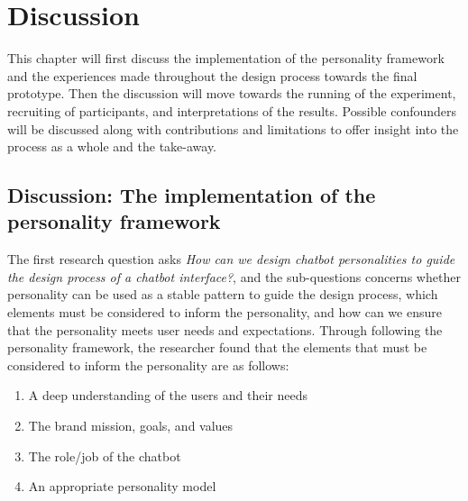 \chapter{Discussion}
\label{chap:discussion}

This chapter will first discuss the implementation of the personality framework and the experiences made throughout the design process towards the final prototype. Then the discussion will move towards the running of the experiment, recruiting of  participants, and interpretations of the results. Possible confounders will be discussed along with contributions and limitations to offer insight into the process as a whole and the take-away. 

\section{Discussion: The implementation of the personality framework}

The first research question asks \textit{How can we design chatbot personalities to guide the design process of a chatbot interface?}, and the sub-questions concerns whether personality can be used as a stable pattern to guide the design process, which elements must be considered to inform the personality, and how can we ensure that the personality meets user needs and expectations. Through following the personality framework, the researcher found that the elements that must be considered to inform the personality are as follows:

\begin{enumerate}
    \item A deep understanding of the users and their needs
    \item The brand mission, goals, and values
    \item The role/job of the chatbot
    \item An appropriate personality model
\end{enumerate}

